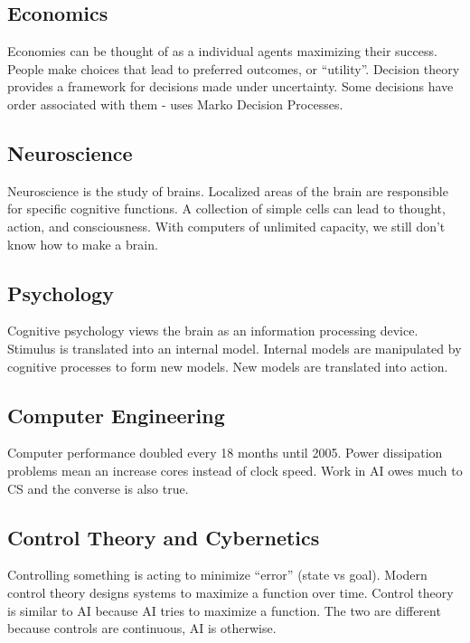 \subsection{Economics} %
\label{sub:economics}

Economies can be thought of as a individual agents maximizing their success.
People make choices that lead to preferred outcomes, or ``utility''.
Decision theory provides a framework for decisions made under uncertainty.
Some decisions have order associated with them - uses Marko Decision Processes.


\subsection{Neuroscience} %
\label{sub:neuroscience}
Neuroscience is the study of brains.
Localized areas of the brain are responsible for specific cognitive functions.
A collection of simple cells can lead to thought, action, and consciousness.
With computers of unlimited capacity, we still don't know how to make a brain.

\subsection{Psychology} %
\label{sub:psychology}
Cognitive psychology views the brain as an information processing device.
Stimulus is translated into an internal model.
Internal models are manipulated by cognitive processes to form new models.
New models are translated into action.

\subsection{Computer Engineering} %
\label{sub:computer_engineering}

Computer performance doubled every 18 months until 2005.
Power dissipation problems mean an increase cores instead of clock speed.
Work in AI owes much to CS and the converse is also true.

\subsection{Control Theory and Cybernetics} %
\label{sub:control_theory_and_cybernetics}

Controlling something is acting to minimize ``error'' (state vs goal).
Modern control theory designs systems to maximize a function over time.
Control theory is similar to AI because AI tries to maximize a function.
The two are different because controls are continuous, AI is otherwise.


